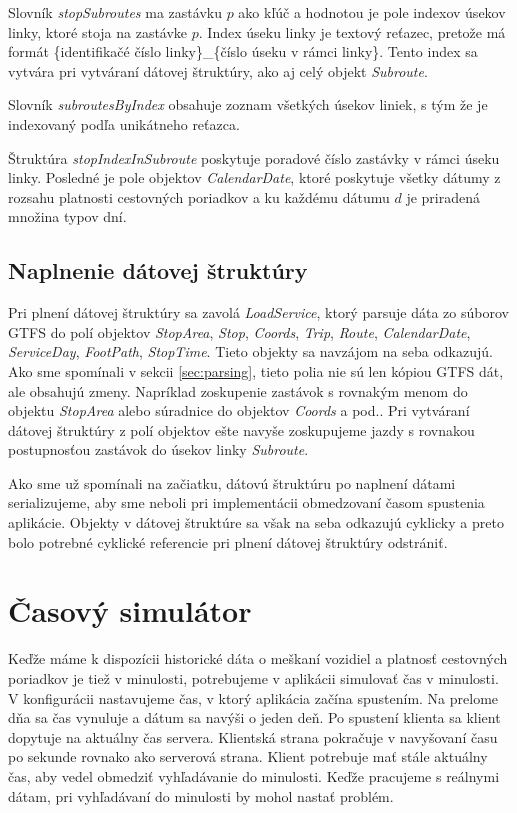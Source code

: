 Slovník \textit{stopSubroutes} ma zastávku $p$ ako kľúč a hodnotou je pole indexov úsekov linky, ktoré stoja na zastávke $p$. Index úseku linky je textový reťazec, pretože má formát \{identifikačé číslo linky\}\_\{číslo úseku v rámci linky\}. Tento index sa vytvára pri vytváraní dátovej štruktúry, ako aj celý objekt \textit{Subroute}. 

Slovník \textit{subroutesByIndex} obsahuje zoznam všetkých úsekov liniek, s tým že je indexovaný podľa unikátneho reťazca.

Štruktúra \textit{stopIndexInSubroute} poskytuje poradové číslo zastávky v rámci úseku linky. Posledné je pole objektov \textit{CalendarDate}, ktoré poskytuje  všetky dátumy z rozsahu platnosti cestovných poriadkov a ku každému dátumu $d$ je priradená množina typov dní. 

\subsection{Naplnenie dátovej štruktúry}
Pri plnení dátovej štruktúry sa zavolá \textit{LoadService}, ktorý parsuje dáta zo súborov GTFS do polí objektov \textit{StopArea}, \textit{Stop}, \textit{Coords}, \textit{Trip}, \textit{Route}, \textit{CalendarDate}, \textit{ServiceDay}, \textit{FootPath}, \textit{StopTime}. Tieto objekty sa navzájom na seba odkazujú. Ako sme spomínali v sekcii \ref{sec:parsing}, tieto polia nie sú len kópiou GTFS dát, ale obsahujú zmeny. Napríklad zoskupenie zastávok s rovnakým menom do objektu \textit{StopArea} alebo súradnice do objektov \textit{Coords} a pod.. Pri vytváraní dátovej štruktúry z polí objektov ešte navyše zoskupujeme jazdy s rovnakou postupnosťou zastávok do úsekov linky \textit{Subroute}. 

Ako sme už spomínali na začiatku, dátovú štruktúru po naplnení dátami serializujeme, aby sme neboli pri implementácii obmedzovaní časom spustenia aplikácie. Objekty v dátovej štruktúre sa však na seba odkazujú cyklicky a preto bolo potrebné cyklické referencie pri plnení dátovej štruktúry odstrániť. 

\section{Časový simulátor}
Keďže máme k dispozícii historické dáta o meškaní vozidiel a platnosť cestovných poriadkov je tiež v minulosti, potrebujeme v aplikácii simulovať čas v minulosti. V konfigurácii nastavujeme čas, v ktorý aplikácia začína spustením. Na prelome dňa sa čas vynuluje a dátum sa navýši o jeden deň. 
Po spustení klienta sa klient dopytuje na aktuálny čas servera. Klientská strana pokračuje v navyšovaní času po sekunde rovnako ako serverová strana. Klient potrebuje mať stále aktuálny čas, aby vedel obmedziť vyhľadávanie do minulosti. Keďže pracujeme s reálnymi dátam, pri vyhľadávaní do minulosti by mohol nastať problém. 

